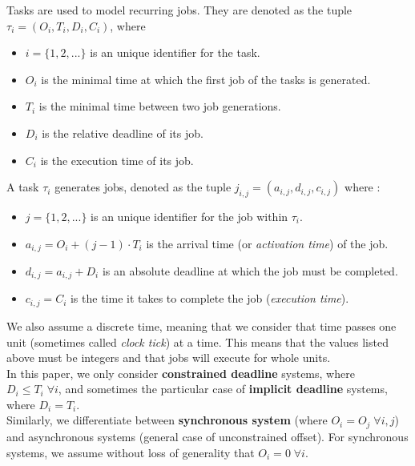 \documentclass[a4paper,10pt]{article}
\begin{document}
        Tasks are used to model recurring jobs. They are denoted as the tuple $\tau_i = (O_i, T_i, D_i, C_i)$, where
        \begin{itemize}
            \item $i = \{1,2,...\}$ is an unique identifier for the task.
            \item $O_i$ is the minimal time at which the first job of the tasks is generated.
            \item $T_i$ is the minimal time between two job generations.
            \item $D_i$ is the relative deadline of its job.
            \item $C_i$ is the execution time of its job.
        \end{itemize}

        A task $\tau_i$ generates jobs, denoted as the tuple $j_{i,j} = (a_{i, j}, d_{i,j}, c_{i,j})$ where :
        \begin{itemize}
            \item $j = \{1,2,...\}$ is an unique identifier for the job within $\tau_i$.
            \item $a_{i,j} = O_i + (j-1) \cdot T_i$ is the arrival time (or \emph{activation time}) of the job.
            \item $d_{i,j} = a_{i,j} + D_i$ is an absolute deadline at which the job must be completed.
            \item $c_{i,j} = C_i$ is the time it takes to complete the job (\emph{execution time}).
        \end{itemize}

        We also assume a discrete time, meaning that we consider that time passes one unit (sometimes called \emph{clock tick}) at a time. This means that the values listed above must be integers and that jobs will execute for whole units.\\

        In this paper, we only consider \textbf{constrained deadline} systems, where $D_i \leqslant T_i \; \forall i$, and sometimes the particular case of \textbf{implicit deadline} systems, where $D_i = T_i$.\\

        Similarly, we differentiate between \textbf{synchronous system} (where $O_i = O_j \; \forall i,j$) and asynchronous systems (general case of unconstrained offset). For synchronous systems, we assume without loss of generality that $O_i = 0 \; \forall i$.\\
\end{document}
